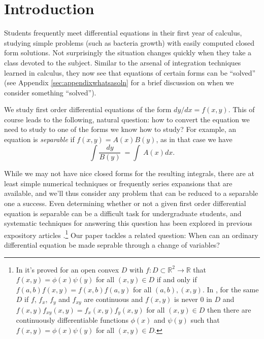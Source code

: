 \documentclass[12pt,reqno]{amsart}
\theoremstyle{plain}
\numberwithin{equation}{section} %
\numberwithin{table}{section} %
\numberwithin{figure}{section}
\begin{document}

\section{Introduction}

Students frequently meet differential equations in their first year of calculus, studying simple problems (such as bacteria growth) with easily computed closed form solutions. Not surprisingly the situation changes quickly when they take a class devoted to the subject. Similar to the arsenal of integration techniques learned in calculus, they now see that equations of certain forms can be ``solved'' (see Appendix \ref{sec:appendixwhatsasoln} for a brief discussion on when we consider something ``solved'').

We study first order differential equations of the form $dy/dx = f(x,y)$.
This of course leads to the following, natural question: how to convert the equation we need to study to one of the forms we know how to study? For example, an equation is \emph{separable} if $f(x,y) = A(x) B(y)$, as in that case we have $$\int \frac{dy}{B(y)} \ = \int \ A(x) dx.$$

While we may not have nice closed forms for the resulting integrals, there are at least simple numerical techniques or frequently series expansions that are available, and we'll thus consider any problem that can be reduced to a separable one a success. Even determining whether or not a given first order differential equation is separable can be a difficult task for undergraduate students, and systematic techniques for answering this question has been explored in previous expository articles \cite{Ci,Sc}.\footnote{In \cite{Sc} it's proved for an open convex $D$ with $f: D \subset \mathbb{R}^2 \to \mathbb{R}$ that $f(x,y) = \phi(x)\psi(y)$ for all $(x,y) \in D$ if and only if
$f(a,b)f(x,y) = f(x,b)f(a,y)$ for all $(a,b), (x,y)$. In \cite{Ci}, for the same $D$ if $f$, $f_x$, $f_y$ and $f_{xy}$ are continuous and $f(x,y)$ is never $0$ in $D$ and
$f(x,y)f_{xy}(x,y) = f_x(x,y)f_y(x,y)$ for all $(x,y) \in D$ then there are continuously differentiable functions $\phi(x)$ and $\psi(y)$ such that
$f(x,y) = \phi(x)\psi(y)$ for all $(x,y) \in D$.}
Our paper tackles a related question: When can an ordinary differential equation be made seprable through a change of variables?
\end{document}
